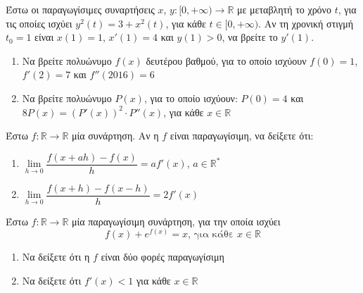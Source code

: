 \documentclass{presentation}
\begin{document}
\begin{askisi}
  Έστω οι παραγωγίσιμες συναρτήσεις $x$, $y:[0,+\infty)\to\mathbb{R}$ με μεταβλητή το χρόνο $t$, για τις οποίες ισχύει $y^2(t)=3+x^2(t)$, για κάθε $t\in [0,+\infty )$. Αν τη χρονική στιγμή $t_0=1$ είναι $x(1)=1$, $x'(1)=4$ και $y(1)>0$, να βρείτε το $y'(1)$.

\end{askisi}

\begin{askisi}
  \begin{enumerate}
    \item<1->  Να βρείτε πολυώνυμο $f(x)$ δευτέρου βαθμού, για το οποίο ισχύουν $f(0)=1$, $f'(2)=7$ και $f''(2016)=6$
    \item<2-> Να βρείτε πολυώνυμο $P(x)$, για το οποίο ισχύουν: $P(0)=4$ και $8P(x)=\left( P'(x)\right)^2\cdot P''(x)  $, για κάθε $x\in\mathbb{R}$
  \end{enumerate}

\end{askisi}

\begin{askisi}
  Έστω $f:\mathbb{R}\to\mathbb{R}$ μία συνάρτηση. Αν η $f$ είναι παραγωγίσιμη, να δείξετε ότι:
  \begin{enumerate}
    \item<1-> $\lim\limits_{h \to 0}{ \dfrac{f(x+ah)-f(x)}{h} }=af'(x)$, $a\in\mathbb{R}^*$
    \item<2-> $\lim\limits_{h \to 0}{ \dfrac{f(x+h)-f(x-h)}{h} }=2f'(x)$
  \end{enumerate}

\end{askisi}

\begin{askisi}
  Έστω $f:\mathbb{R}\to\mathbb{R}$ μία παραγωγίσιμη συνάρτηση, για την οποία ισχύει
  $$f(x)+e^{f(x)}=x \text{, για κάθε } x\in\mathbb{R}$$
  \begin{enumerate}
    \item<1-> Να δείξετε ότι η $f$ είναι δύο φορές παραγωγίσιμη
    \item<2-> Να δείξετε ότι $f'(x)<1$ για κάθε $x\in\mathbb{R}$
  \end{enumerate}

\end{askisi}
\end{document}
